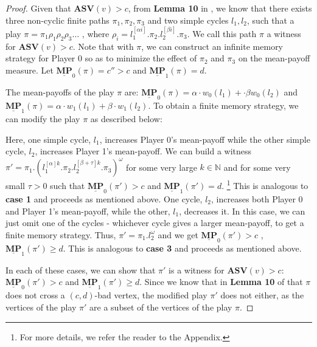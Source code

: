 \begin{proof}
Given that $\mathbf{ASV}(v) > c$, from \textbf{Lemma 10} in \cite{FGR20}, we know that there exists three non-cyclic finite paths $\pi_1, \pi_2, \pi_3$ and two simple cycles $l_1, l_2$, such that a play $\pi = \pi_1\rho_1\rho_2\rho_3\dots$ , where $\rho_i = l_1^{[\alpha i]}.\pi_2.l_2^{[\beta i]}.\pi_3$. We call this path $\pi$ a witness for $\mathbf{ASV}(v) > c$. Note that with $\pi$, we can construct an infinite memory strategy for Player 0 so as to minimize the effect of $\pi_2$ and $\pi_3$ on the mean-payoff measure. Let $\underline{\mathbf{MP}}_0(\pi) = c'' > c$ and $\underline{\mathbf{MP}}_1(\pi) = d$.

\noindent The mean-payoffs of the play $\pi$ are: $\underline{\mathbf{MP}}_0(\pi) = \alpha \cdot w_0(l_1) + \cdot \beta w_0(l_2)$ and $\underline{\mathbf{MP}}_1(\pi) = \alpha \cdot w_1(l_1) + \beta \cdot w_1(l_2)$. To obtain a finite memory strategy, we can modify the play $\pi$ as described below:
\begin{caseof}
    Here, one simple cycle, $l_1$, increases Player 0's mean-payoff while the other simple cycle, $l_2$, increases Player 1's mean-payoff. We can build a witness $\pi' = \pi_1.(l_1^{[\alpha]k}.\pi_2.l_2^{[\beta+\tau]k}.\pi_3)^{\omega}$ for some very large $k \in \mathbb{N}$ and for some very small $\tau > 0$ such that $\underline{\mathbf{MP}}_0(\pi') > c$ and $\underline{\mathbf{MP}}_1(\pi') = d$. \footnote{For more details, we refer the reader to the Appendix.}
    This is analogous to \textbf{case 1} and proceeds as mentioned above.
    One cycle, $l_2$, increases both Player 0 and Player 1's mean-payoff, while the other, $l_1$, decreases it. In this case, we can just omit one of the cycles - whichever cycle gives a larger mean-payoff, to get a finite memory strategy. Thus, $\pi' = \pi_1.l_2^{\omega}$ and we get $\underline{\mathbf{MP}}_0(\pi') > c$ , $\underline{\mathbf{MP}}_1(\pi') \geqslant d$.
    This is analogous to \textbf{case 3} and proceeds as mentioned above.
\end{caseof}
In each of these cases, we can show that $\pi'$ is a witness for $\mathbf{ASV}(v) > c$: $\underline{\mathbf{MP}}_0(\pi') > c$ and $\underline{\mathbf{MP}}_1(\pi') \geqslant d$. Since we know that in \textbf{Lemma 10} of \cite{FGR20} that $\pi$ does not cross a $(c,d)$-bad vertex, the modified play $\pi'$ does not either, as the vertices of the play $\pi'$ are a subset of the vertices of the play $\pi$. 


\end{proof}
